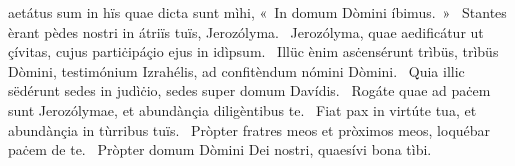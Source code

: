 \psalmChapterWithInscription{}
{ }
{%
aetátus sum in hïs quae dicta sunt mìhi, «~In domum Dòmini íbimus.~»
~Stantes èrant pèdes nostri in átriïs tuïs, Jerozólyma. 
~Jerozólyma, quae aedificátur ut çívitas, cujus partiċipáçio ejus in idìpsum. 
~Illüc ènim asċensérunt trìbüs, trìbüs Dòmini, testimónium Izrahélis, ad confitèndum nómini Dòmini. 
~Quia illic sëdérunt sedes in judìċio, sedes super domum Davídis. 
~Rogáte quae ad paċem sunt Jerozólymae, et abundànçia diligèntibus te. 
~Fiat pax in virtúte tua, et abundànçia in tùrribus tuïs. 
~Pròpter fratres meos et pròximos meos, loquébar paċem de te. 
~Pròpter domum Dòmini Dei nostri, quaesívi bona tìbi. 
}
